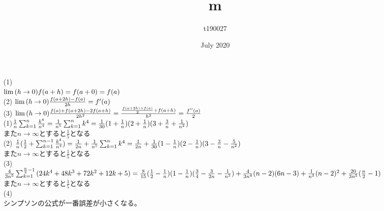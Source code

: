 \documentclass{article}
\title{m}
\author{t190027}
\date{July 2020}
\begin{document}
\maketitle{}
(1)\\
$\lim{(h\to0)}f(a+h)\\
=f(a+0)=f(a)$\\
(2)
$\lim{(h\to0)}\frac{f(a+2h)-f(a)}{2h}\\
=f'(a)$\\
(3)
$\lim{(h\to0)}\frac{f(a)+f(a+2h)-2f(a+h)}{2h^{2}}\\
=\frac{\frac{f(a+2h)+f(a)}{2}+f(a+h)}{h^{2}}\\
=\frac{f''(a)}{2}$\\
(1)$\frac{1}{n}\sum_{k=1}^{n}{\frac{k^{4}}{n^{4}}}\\
=\frac{1}{n^{5}}\sum_{k=1}^{n}{k^{4}\\
=\frac{1}{30}(1+\frac{1}{n})(2+\frac{1}{n})(3+\frac{3}{n}+\frac{1}{n^{2}})}$\\
また$n\to \infty$とすると$\frac{1}{5}$となる\\
(2)
$\frac{1}{n}(\frac{1}{2}+\sum_{k=1}^{n-1}{\frac{k^{4}}{n^{4}}})\\
=\frac{1}{2n}+\frac{1}{n^{5}}\sum_{k=1}^{n}{k^{4}\\
=\frac{1}{2n}+\frac{1}{30}(1-\frac{1}{n})(2-\frac{1}{n})(3-\frac{3}{n}-\frac{5}{n^{2}})}$\\
また$n\to \infty$とすると$\frac{1}{5}$となる\\
(3)\\$\frac{4}{3n^{5}}\sum_{k=1}^{\frac{n}{2}-1}{(24k^{4}+48k^{3}+72k^{2}+12k+5)}\\
=\frac{8}{15}(\frac{1}{2}-\frac{1}{n})(1-\frac{1}{n})(\frac{3}{4}-\frac{3}{2n}-\frac{1}{n^{2}})+\frac{4}{3n^{4}}(n-2)(6n-3)+\frac{1}{n^{3}}(n-2)^{2}+\frac{20}{3n^{5}}(\frac{n}{2}-1)$\\
また$n\to \infty$とすると$\frac{1}{5}$となる\\
(4)\\シンプソンの公式が一番誤差が小さくなる。
\end{document}
